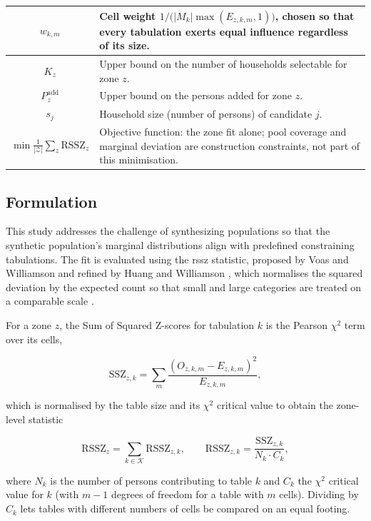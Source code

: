 \begin{longtable}{|c|p{10cm}|}
\( w_{k,m} \) & Cell weight \( 1/\bigl(|M_k|\max(E_{z,k,m}, 1)\bigr) \), chosen so that every tabulation exerts equal influence regardless of its size. \\ \hline
\( K_z \) & Upper bound on the number of households selectable for zone \( z \). \\ \hline
\( P^{\text{add}}_z \) & Upper bound on the persons added for zone \( z \). \\ \hline
\( s_j \) & Household size (number of persons) of candidate \( j \). \\ \hline
\( \min \frac{1}{|\mathcal{Z}|}\sum_{z} \text{RSSZ}_z \) & Objective function: the zone fit alone; pool coverage and marginal deviation are construction constraints, not part of this minimisation. \\ \hline

\end{longtable}

\FloatBarrier
\subsection{Formulation}
This study addresses the challenge of synthesizing populations so that the synthetic population's marginal distributions align with predefined constraining tabulations. The fit is evaluated using the \gls{rssz} statistic, proposed by Voas and Williamson \cite{Voas2001EvaluatingMicrodata} and refined by Huang and Williamson \cite{Huang2001AMicrodata.}, which normalises the squared deviation by the expected count so that small and large categories are treated on a comparable scale \citep{Rahman2023PopulationTechnique}.

For a zone \( z \), the Sum of Squared Z-scores for tabulation \( k \) is the Pearson \(\chi^2\) term over its cells,

\[
\text{SSZ}_{z,k} = \sum_{m} \frac{\left( O_{z,k,m} - E_{z,k,m} \right)^2}{E_{z,k,m}},
\]

which is normalised by the table size and its \(\chi^2\) critical value to obtain the zone-level statistic

\[
\text{RSSZ}_z = \sum_{k \in \mathcal{K}} \text{RSSZ}_{z,k}, \qquad
\text{RSSZ}_{z,k} = \frac{\text{SSZ}_{z,k}}{N_k \cdot C_k},
\]

where \( N_k \) is the number of persons contributing to table \( k \) and \( C_k \) the \(\chi^2\) critical value for \( k \) (with \( m-1 \) degrees of freedom for a table with \( m \) cells). Dividing by \( C_k \) lets tables with different numbers of cells be compared on an equal footing.

